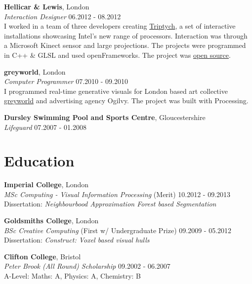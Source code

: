 \documentclass[margin,line,a4paper]{resume}
\begin{document}
\begin{resume}
\textbf{Hellicar \& Lewis}, London \vspace{1mm}\\
\textsl{Interaction Designer} \hfill 06.2012 - 08.2012 \vspace{2mm} \\
I worked in a team of three developers creating
\href{http://www.hellicarandlewis.com/2012/07/19/triptych}{Triptych},
a set of interactive installations showcasing Intel's new range of
processors. Interaction was through a Microsoft Kinect sensor and
large projections. The projects were programmed in C++ \& GLSL and
used openFrameworks. The project was
\href{https://github.com/HellicarAndLewis/Triptych}{open source}.


\textbf{greyworld}, London  \vspace{1mm}\\
\textsl{Computer Programmer} \hfill 07.2010 - 09.2010 \vspace{2mm} \\
I programmed real-time generative visuals for London
based art collective \href{http://greyworld.org}{greyworld} and
advertising agency Ogilvy. The project was built with Processing.

\textbf{Dursley Swimming Pool and Sports Centre}, Gloucestershire  \vspace{1mm}\\
\textsl{Lifeguard} \hfill 07.2007 - 01.2008


\section{\mysidestyle Education}

\textbf{Imperial College}, London \vspace{0.5mm}\\
\textsl{MSc Computing - Visual Information Processing} (Merit) \hfill 10.2012 - 09.2013 \vspace{2mm} \\
Dissertation: \emph{Neighbourbood Approximation Forest based Segmentation}

\textbf{Goldsmiths College}, London \vspace{0.5mm}\\
\textsl{BSc Creative Computing} (First w/ Undergraduate Prize) \hfill 09.2009 - 05.2012 \vspace{2mm} \\
Dissertation: \emph{Construct: Voxel based visual hulls}

\textbf{Clifton College}, Bristol \vspace{0.5mm}\\
\textsl{Peter Brook (All Round) Scholarship} \hfill 09.2002 - 06.2007 \vspace{2mm} \\
A-Level: Maths: A, Physics: A, Chemistry: B \\


\end{resume}
\end{document}
